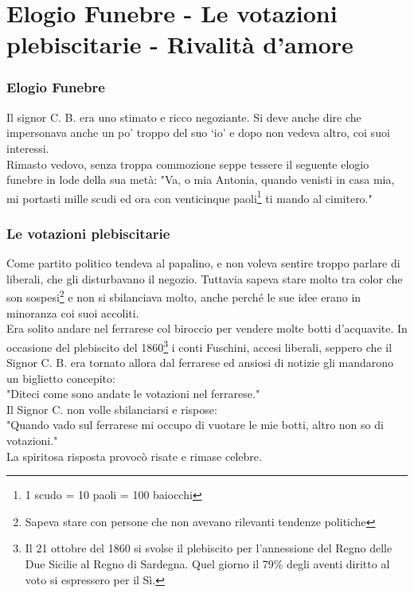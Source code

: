 \documentclass[10pt]{memoir} %
\begin{document}

\chapter{Elogio Funebre - Le votazioni plebiscitarie - Rivalità d'amore}
\subsection{Elogio Funebre}
Il signor C. B. era uno stimato e ricco negoziante. Si deve anche dire che impersonava anche un po' troppo del suo ‘io' e dopo non vedeva altro, coi suoi interessi.\\
Rimasto vedovo, senza troppa commozione seppe tessere il seguente elogio funebre in lode della sua metà:
"Va, o mia Antonia, quando venisti in casa mia, mi portasti mille scudi ed ora con venticinque paoli\footnote{1 scudo = 10 paoli = 100 baiocchi} ti mando al cimitero."\\
\subsection{Le votazioni plebiscitarie}
Come partito politico tendeva al papalino, e non voleva sentire troppo parlare di liberali, che gli disturbavano il negozio. Tuttavia sapeva stare molto tra color che son sospesi\footnote{Sapeva stare con persone che non avevano rilevanti tendenze politiche} e non si sbilanciava molto, anche perché le sue idee erano in minoranza coi suoi accoliti.\\
Era solito andare nel ferrarese col biroccio per vendere molte botti d'acquavite. In occasione del plebiscito del 1860\footnote{Il 21 ottobre del 1860 si svolse il plebiscito per l’annessione del Regno delle Due Sicilie al Regno di Sardegna. Quel giorno il 79\% degli aventi diritto al voto si espressero per il Sì.} i conti Fuschini, accesi liberali, seppero che il Signor C. B. era tornato allora dal ferrarese ed ansiosi di notizie gli mandarono un biglietto concepito:\\
"Diteci come sono andate le votazioni nel ferrarese."\\
Il Signor C. non volle sbilanciarsi e rispose:\\
"Quando vado sul ferrarese mi occupo di vuotare le mie botti, altro non so di votazioni."\\
La spiritosa risposta provocò risate e rimase celebre. \\
\end{document}

